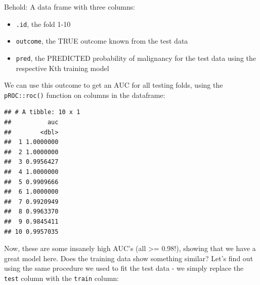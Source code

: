 \documentclass[]{article}
\newenvironment{Shaded}{\begin{snugshade}}{\end{snugshade}}
\newcommand{\KeywordTok}[1]{\textcolor[rgb]{0.13,0.29,0.53}{\textbf{#1}}}
\newcommand{\DataTypeTok}[1]{\textcolor[rgb]{0.13,0.29,0.53}{#1}}
\newcommand{\StringTok}[1]{\textcolor[rgb]{0.31,0.60,0.02}{#1}}
\newcommand{\OperatorTok}[1]{\textcolor[rgb]{0.81,0.36,0.00}{\textbf{#1}}}
\newcommand{\NormalTok}[1]{#1}
\providecommand{\tightlist}{%
  \setlength{\itemsep}{0pt}\setlength{\parskip}{0pt}}
\begin{document}
Behold: A data frame with three columns:

\begin{itemize}
\tightlist
\item
  \texttt{.id}, the fold 1-10
\item
  \texttt{outcome}, the TRUE outcome known from the test data
\item
  \texttt{pred}, the PREDICTED probability of malignancy for the test
  data using the respective Kth training model
\end{itemize}

We can use this outcome to get an AUC for all testing folds, using the
\texttt{pROC::roc()} function on columns in the dataframe:

\begin{Shaded}
\end{Shaded}

\begin{verbatim}
## # A tibble: 10 x 1
##          auc
##        <dbl>
##  1 1.0000000
##  2 1.0000000
##  3 0.9956427
##  4 1.0000000
##  5 0.9909666
##  6 1.0000000
##  7 0.9920949
##  8 0.9963370
##  9 0.9845411
## 10 0.9957035
\end{verbatim}

Now, these are some insanely high AUC's (all \textgreater{}= 0.98!),
showing that we have a great model here. Does the training data show
something similar? Let's find out using the same procedure we used to
fit the test data - we simply replace the \texttt{test} column with the
\texttt{train} column:
\end{document}
